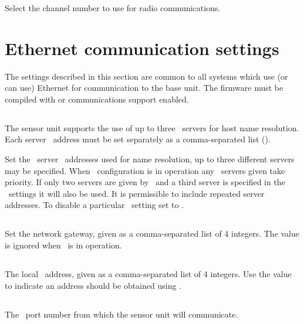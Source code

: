 Select the channel number to use for radio communications.


\section{Ethernet communication settings}

The settings described in this section are common to all systems
which use (or can use) Ethernet for communication to the base unit.
The firmware must be compiled with  or 
communications support enabled.

\subsection[dns1, dns2, dns3]{\newline {}\newline {}}
The sensor unit supports the use of up to three \dns\ servers for host
name resolution. Each server \ip\ address must be set separately as a
comma-separated list ().

Set the \dns\ server \ip\ addresses used for name resolution, up to
three different servers may be specified. When \dhcp\ configuration is
in operation any \dns\ servers given take priority. If only two
servers are given by \dhcp\ and a third server is specified in the
\eeprom\ settings it will also be used. It is permissible to include
repeated server addresses. To disable a particular \dns\ setting set
to .

\subsection[gateway]{}

Set the network gateway, given as a comma-separated list of 4
integers. The value is ignored when \dhcp\ is in operation.

\subsection[local-ip-address]{}

The local \ip\ address, given as a comma-separated list of 4
integers. Use the value  to indicate an
address should be obtained using \dhcp.

\subsection[local-ip-port]{}
The \udp\ port number from which the sensor unit will communicate.

